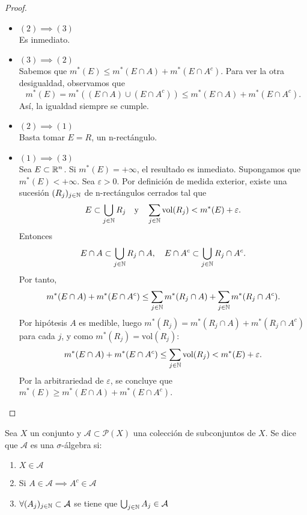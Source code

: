 \begin{proof}
    \leavevmode
    \begin{itemize}
        \item \textbf{$(2) \implies (3)$}\\
              Es inmediato.
        \item \textbf{$(3) \implies (2)$}\\
              Sabemos que $m^*(E) \leq m^*(E \cap A) + m^*(E \cap A^c)$. Para ver la otra desigualdad, observamos que
              \[
                  m^*(E) = m^*((E \cap A) \cup (E \cap A^c)) \leq m^*(E \cap A) + m^*(E \cap A^c).
              \]
              Así, la igualdad siempre se cumple.
        \item \textbf{$(2) \implies (1)$}\\
              Basta tomar $E = R$, un n-rectángulo.
        \item \textbf{$(1) \implies (3)$}\\
              Sea $E \subset \mathbb{R}^n$. Si $m^*(E) = +\infty$, el resultado es inmediato. Supongamos que $m^*(E) < +\infty$. Sea $\varepsilon > 0$. Por definición de medida exterior, existe una sucesión $(R_j)_{j \in \mathbb{N}}$ de n-rectángulos cerrados tal que
              \[
                  E \subset \bigcup_{j \in \mathbb{N}} R_j \quad \text{y} \quad \sum_{j \in \mathbb{N}} \text{vol}(R_j) < m^*(E) + \varepsilon.
              \]
              Entonces
              \[
                  E \cap A \subset \bigcup_{j \in \mathbb{N}} R_j \cap A, \quad E \cap A^c \subset \bigcup_{j \in \mathbb{N}} R_j \cap A^c.
              \]
              Por tanto,
              \[
                  m^*(E \cap A) + m^*(E \cap A^c) \leq \sum_{j \in \mathbb{N}} m^*(R_j \cap A) + \sum_{j \in \mathbb{N}} m^*(R_j \cap A^c).
              \]
              Por hipótesis $A$ es medible, luego $m^*(R_j) = m^*(R_j \cap A) + m^*(R_j \cap A^c)$ para
              cada $j$, y como $m^*(R_j) = \text{vol}(R_j)$:
              \[
                  m^*(E \cap A) + m^*(E \cap A^c) \leq \sum_{j \in \mathbb{N}} \text{vol}(R_j) < m^*(E) + \varepsilon.
              \]
              Por la arbitrariedad de $\varepsilon$, se concluye que $m^*(E) \geq m^*(E \cap A) +
                  m^*(E \cap A^c)$.
    \end{itemize}
\end{proof}

\begin{definición}
Sea $X$ un conjunto y $\mathcal{A} \subset \mathcal{P}(X)$ una colección de subconjuntos de $X$. Se dice que $\mathcal{A}$ es una $\sigma$-álgebra si:
\vspace{-0.5em}
\begin{enumerate}
    \item $X \in \mathcal{A}$
    \item Si $A \in \mathcal{A} \implies A^c \in \mathcal{A}$
    \item $\forall (A_j)_{j \in \mathbb{N}} \subset \mathcal{A}$ se tiene que $\bigcup_{j \in \mathbb{N}} A_j \in \mathcal{A}$
\end{enumerate}
\end{definición}

